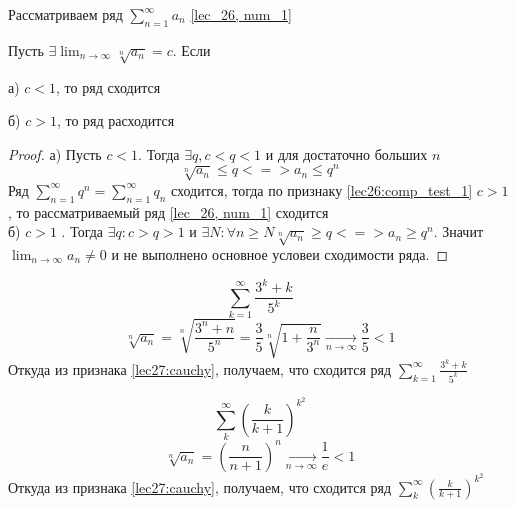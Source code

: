 \documentclass[../../main.tex]{subfiles}
\begin{document}
	
	Рассматриваем ряд $\sum_{n=1}^{\infty} a_n$ \ref{lec_26, num_1}
	
	\begin{thm}\label{lec27:cauchy} 
		
		Пусть $\exists \lim_{n \to \infty } \sqrt[n]{a_n}  = c$. Если
		
			а) $c < 1$, то ряд сходится 
			
			б) $c>1$, то ряд расходится
		
	\begin{proof}
		 а) Пусть $c < 1$. Тогда $\exists q, c < q < 1$ и для достаточно больших $n$
			\[ \sqrt[n]{a_n} \leq q <=> a_n \leq q^n \]
			Ряд $\sum_{n=1}^{\infty} q^n = \sum_{n=1}^{\infty} q_n$ сходится, тогда по 
			признаку \ref{lec26:comp_test_1}
			 $c>1$, то рассматриваемый ряд \ref{lec_26, num_1} сходится \\
			 
			 б) $c>1$ . Тогда $\exists q : c > q > 1 $ и $\exists N : \forall n \geq N 
			 \sqrt[n]{a_n} \geq q <=> a_n \geq q^n$. Значит $\lim_{n \to \infty} a_n 
			 \neq 0$ и не выполнено основное условеи сходимости ряда.
		
		
	\end{proof}
	\end{thm}

	\begin{example}
		\[ \sum_{k=1}^{\infty}  \frac{3^k + k}{5^k}  \]
		\[ \sqrt[n]{a_n} = \sqrt[n]{\frac{3^n + n}{5^n}} = \frac{3}{5} \sqrt[n]{1 + 
		\frac{n}{3^n}}  \underset{n \rightarrow \infty}
		{\longrightarrow} \frac{3}{5} < 1    \]
		Откуда из признака \ref{lec27:cauchy}, получаем, что сходится ряд 
		$\sum_{k=1}^{\infty}  \frac{3^k + k}{5^k}$
		
	\end{example} 
 
	\begin{example}
		\[ \sum_{k}^{\infty} \left( \frac{k}{k+1}\right) ^{k^2}   \]
		\[ \sqrt[n]{a_n} =  \left( \frac{n}{n+1}\right) ^n  \underset{n \rightarrow 
		\infty}
		{\longrightarrow} \frac{1}{e} < 1  \]
		Откуда из признака \ref{lec27:cauchy}, получаем, что сходится ряд 
		$\sum_{k}^{\infty} \left( \frac{k}{k+1}\right) ^{k^2}$
		
		
	\end{example} 	
\end{document}
